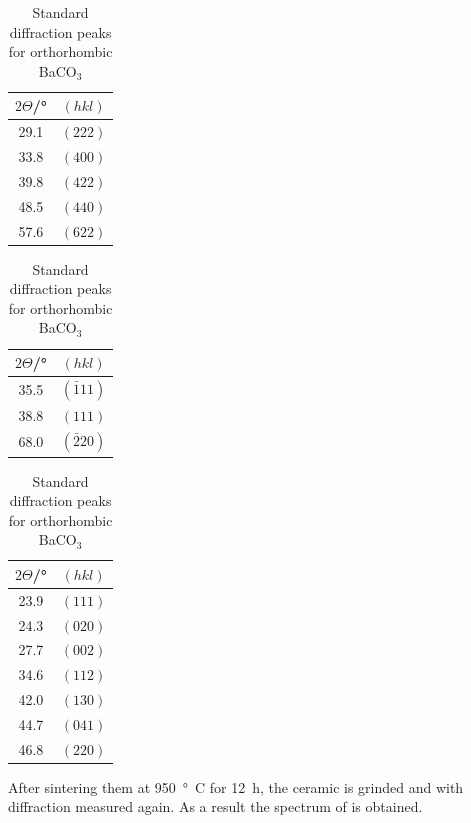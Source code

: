 \documentclass[12pt, a4paper]{article}
\begin{document}
\begin{table}[H]
	\centering
	\begin{minipage}{0.3\textwidth}
		\centering
		\begin{tabular}{cc}
			\toprule
			$2\Theta$/° & $(hkl)$ \\
			\midrule
			29.1          & $(222)$ \\
			33.8          & $(400)$ \\
			39.8          & $(422)$ \\
			48.5          & $(440)$ \\
			57.6          & $(622)$ \\
			\bottomrule
		\end{tabular}
		\caption{Standard diffraction peaks for cubic Y$_2$O$_3$}\label{tab:yo}
	\end{minipage}
	\hfill
	\begin{minipage}{0.3\textwidth}
		\centering
		\begin{tabular}{cc}
			\toprule
			$2\Theta$/° & $(hkl)$       \\
			\midrule
			35.5          & $(\bar{1}11)$ \\
			38.8          & $(111)$       \\
			68.0          & $(\bar{2}20)$ \\
			\bottomrule
		\end{tabular}
		\caption{Standard diffraction peaks for CuO}\label{tab:cuo}
	\end{minipage}
	\hfill
	\begin{minipage}{0.3\textwidth}
		\centering
		\begin{tabular}{cc}
			\toprule
			$2\Theta$/° & $(hkl)$ \\
			\midrule
			23.9          & $(111)$ \\
			24.3          & $(020)$ \\
			27.7          & $(002)$ \\
			34.6          & $(112)$ \\
			42.0          & $(130)$ \\
			44.7          & $(041)$ \\
			46.8          & $(220)$ \\
			\bottomrule
		\end{tabular}
		\caption{Standard diffraction peaks for orthorhombic BaCO$_3$}\label{tab:baco}
	\end{minipage}
\end{table}
After sintering them at \SI{950}{°C} for \SI{12}{h}, the ceramic is grinded and with diffraction measured again. As a result the spectrum of  is obtained.
\end{document}
